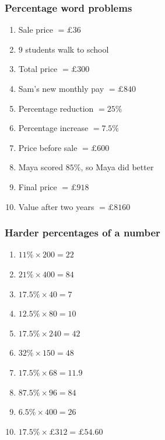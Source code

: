 \documentclass{beamer}
\begin{document}
\begin{frame}[shrink=15]
\frametitle{Percentage word problems}
\footnotesize
\begin{enumerate}\setlength{\itemsep}{1pt}
\item Sale price \(= \pounds 36\)
\item \(9\) students walk to school
\item Total price \(= \pounds 300\)
\item Sam's new monthly pay \(= \pounds 840\)
\item Percentage reduction \(=25\%\)
\item Percentage increase \(=7.5\%\)
\item Price before sale \(= \pounds 600\)
\item Maya scored \(85\%\), so Maya did better
\item Final price \(= \pounds 918\)
\item Value after two years \(= \pounds 8160\)
\end{enumerate}
\end{frame}

\begin{frame}[shrink=15]
\frametitle{Harder percentages of a number}
\footnotesize
\begin{enumerate}\setlength{\itemsep}{1pt}
\item \(11\%\times 200=22\)
\item \(21\%\times 400=84\)
\item \(17.5\%\times 40=7\)
\item \(12.5\%\times 80=10\)
\item \(17.5\%\times 240=42\)
\item \(32\%\times 150=48\)
\item \(17.5\%\times 68=11.9\)
\item \(87.5\%\times 96=84\)
\item \(6.5\%\times 400=26\)
\item \(17.5\%\times \pounds 312=\pounds 54.60\)
\end{enumerate}
\end{frame}
\end{document}

